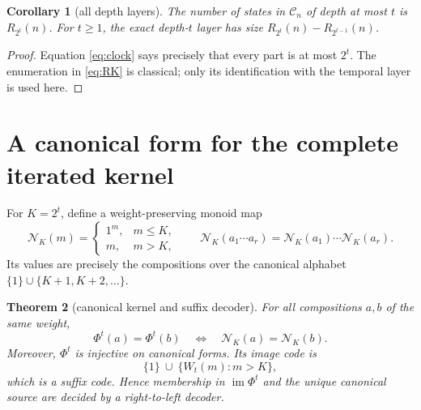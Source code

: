 \documentclass[10pt,a4paper]{amsart}
\newtheorem{theorem}{Theorem}[section]
\newtheorem{corollary}[theorem]{Corollary}
\theoremstyle{definition}
\theoremstyle{remark}
\newcommand{\Comp}{\mathcal C}
\newcommand{\NF}{\mathcal N}
\newcommand{\im}{\operatorname{im}}
\begin{document}
\begin{corollary}[all depth layers]\label{cor:depth}
The number of states in $\Comp_n$ of depth at most $t$ is $R_{2^t}(n)$.
For $t\geq1$, the exact depth-$t$ layer has size
$R_{2^t}(n)-R_{2^{t-1}}(n)$.
\end{corollary}

\begin{proof}
Equation \eqref{eq:clock} says precisely that every part is at most $2^t$.
The enumeration in \eqref{eq:RK} is classical; only its identification with
the temporal layer is used here.
\end{proof}

\section{A canonical form for the complete iterated kernel}

For $K=2^t$, define a weight-preserving monoid map
\begin{equation}
 \NF_K(m)=
 \begin{cases}
  1^m,&m\leq K,\\
  m,&m>K,
 \end{cases}
 \qquad
 \NF_K(a_1\cdots a_r)=\NF_K(a_1)\cdots\NF_K(a_r).        \label{eq:normal}
\end{equation}
Its values are precisely the compositions over the canonical alphabet
$\{1\}\cup\{K+1,K+2,\ldots\}$.

\begin{theorem}[canonical kernel and suffix decoder]\label{thm:kernel}
For all compositions $a,b$ of the same weight,
\begin{equation}
                 \Phi^t(a)=\Phi^t(b)
                 \quad\Longleftrightarrow\quad
                 \NF_K(a)=\NF_K(b).                     \label{eq:kernel}
\end{equation}
Moreover, $\Phi^t$ is injective on canonical forms.  Its image code is
\begin{equation}
        \{1\}\ \cup\ \{W_t(m):m>K\},                    \label{eq:code}
\end{equation}
which is a suffix code.  Hence membership in $\im\Phi^t$ and the unique
canonical source are decided by a right-to-left decoder.
\end{theorem}
\end{document}
